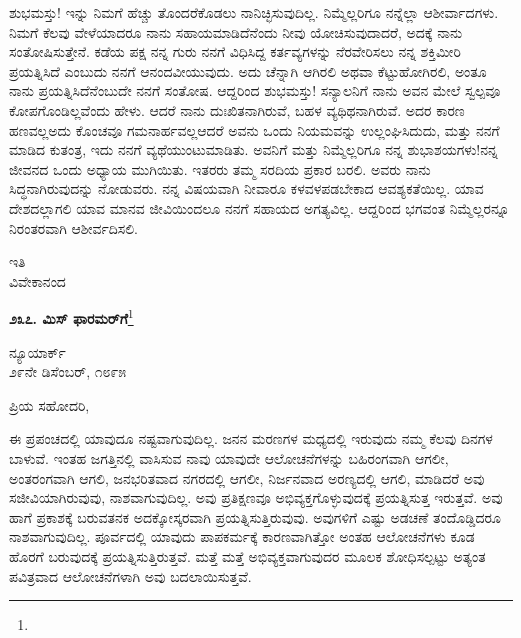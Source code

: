 ಶುಭಮಸ್ತು! ಇನ್ನು ನಿಮಗೆ ಹೆಚ್ಚು ತೊಂದರೆಕೊಡಲು ನಾನಿಚ್ಛಿಸುವುದಿಲ್ಲ. ನಿಮ್ಮೆಲ್ಲರಿಗೂ ನನ್ನೆಲ್ಲಾ ಆಶೀರ್ವಾದಗಳು. ನಿಮಗೆ ಕೆಲವು ವೇಳೆಯಾದರೂ ನಾನು ಸಹಾಯಮಾಡಿದೆನೆಂದು ನೀವು ಯೋಚಿಸುವುದಾದರೆ, ಅದಕ್ಕೆ ನಾನು ಸಂತೋಷಿಸುತ್ತೇನೆ. ಕಡೆಯ ಪಕ್ಷ ನನ್ನ ಗುರು ನನಗೆ ವಿಧಿಸಿದ್ದ ಕರ್ತವ್ಯಗಳನ್ನು ನೆರವೇರಿಸಲು ನನ್ನ ಶಕ್ತಿಮೀರಿ ಪ್ರಯತ್ನಿಸಿದೆ ಎಂಬುದು ನನಗೆ ಆನಂದವೀಯುವುದು. ಅದು ಚೆನ್ನಾಗಿ ಆಗಿರಲಿ ಅಥವಾ ಕೆಟ್ಟುಹೋಗಿರಲಿ, ಅಂತೂ ನಾನು ಪ್ರಯತ್ನಿಸಿದೆನೆಂಬುದೇ ನನಗೆ ಸಂತೋಷ. ಆದ್ದರಿಂದ ಶುಭಮಸ್ತು! ಸನ್ಯಾಲನಿಗೆ ನಾನು ಅವನ ಮೇಲೆ ಸ್ವಲ್ಪವೂ ಕೋಪಗೊಂಡಿಲ್ಲವೆಂದು ಹೇಳು. ಆದರೆ ನಾನು ದುಃಖಿತನಾಗಿರುವೆ, ಬಹಳ ವ್ಯಥಿಥನಾಗಿರುವೆ. ಅದರ ಕಾರಣ ಹಣವಲ್ಲ\enginline{-}ಅದು ಕೊಂಚವೂ ಗಮನಾರ್ಹವಲ್ಲ\enginline{-}ಆದರೆ ಅವನು ಒಂದು ನಿಯಮವನ್ನು ಉಲ್ಲಂಘಿಸಿದುದು, ಮತ್ತು ನನಗೆ ಮಾಡಿದ ಕುತಂತ್ರ, ಇದು ನನಗೆ ವ್ಯಥೆಯುಂಟುಮಾಡಿತು. ಅವನಿಗೆ ಮತ್ತು ನಿಮ್ಮೆಲ್ಲರಿಗೂ ನನ್ನ ಶುಭಾಶಯಗಳು!ನನ್ನ ಜೀವನದ ಒಂದು ಅಧ್ಯಾಯ ಮುಗಿಯಿತು. ಇತರರು ತಮ್ಮ ಸರದಿಯ ಪ್ರಕಾರ ಬರಲಿ. ಅವರು ನಾನು ಸಿದ್ಧನಾಗಿರುವುದನ್ನು ನೋಡುವರು. ನನ್ನ ವಿಷಯವಾಗಿ ನೀವಾರೂ ಕಳವಳಪಡಬೇಕಾದ ಆವಶ್ಯಕತೆಯಿಲ್ಲ. ಯಾವ ದೇಶದಲ್ಲಾಗಲಿ ಯಾವ ಮಾನವ ಜೀವಿಯಿಂದಲೂ ನನಗೆ ಸಹಾಯದ ಅಗತ್ಯವಿಲ್ಲ. ಆದ್ದರಿಂದ ಭಗವಂತ ನಿಮ್ಮೆಲ್ಲರನ್ನೂ ನಿರಂತರವಾಗಿ ಆಶೀರ್ವದಿಸಲಿ.

\vspace{-0.5cm}

{\flushright
ಇತಿ\\ವಿವೇಕಾನಂದ\par}

\begin{center}
\textbf{೨೩೭. ಮಿಸ್ ಫಾರಮರ್‌ಗೆ}\footnote{}
\end{center}

\vspace{-0.65cm}

\begin{flushright}
ನ್ಯೂಯಾರ್ಕ್\\೨೯ನೇ ಡಿಸೆಂಬರ್, ೧೮೯೫
\end{flushright}

\vspace{-0.3cm}

\noindent
ಪ್ರಿಯ ಸಹೋದರಿ,

ಈ ಪ್ರಪಂಚದಲ್ಲಿ ಯಾವುದೂ ನಷ್ಟವಾಗುವುದಿಲ್ಲ. ಜನನ ಮರಣಗಳ ಮಧ್ಯದಲ್ಲಿ ಇರುವುದು ನಮ್ಮ ಕೆಲವು ದಿನಗಳ ಬಾಳುವೆ. ಇಂತಹ ಜಗತ್ತಿನಲ್ಲಿ ವಾಸಿಸುವ ನಾವು ಯಾವುದೇ ಆಲೋಚನೆಗಳನ್ನು ಬಹಿರಂಗವಾಗಿ ಆಗಲೀ, ಅಂತರಂಗವಾಗಿ ಆಗಲಿ, ಜನಭರಿತವಾದ ನಗರದಲ್ಲಿ ಆಗಲೀ, ನಿರ್ಜನವಾದ ಅರಣ್ಯದಲ್ಲಿ ಆಗಲಿ, ಮಾಡಿದರೆ ಅವು ಸಜೀವಿಯಾಗಿರುವುವು, ನಾಶವಾಗುವುದಿಲ್ಲ. ಅವು ಪ್ರತಿಕ್ಷಣವೂ ಅಭಿವ್ಯಕ್ತಗೊಳ್ಳುವುದಕ್ಕೆ ಪ್ರಯತ್ನಿಸುತ್ತ ಇರುತ್ತವೆ. ಅವು ಹಾಗೆ ಪ್ರಕಾಶಕ್ಕೆ ಬರುವತನಕ ಅದಕ್ಕೋಸ್ಕರವಾಗಿ ಪ್ರಯತ್ನಿಸುತ್ತಿರುವುವು. ಅವುಗಳಿಗೆ ಎಷ್ಟು ಅಡಚಣೆ ತಂದೊಡ್ಡಿದರೂ ನಾಶವಾಗುವುದಿಲ್ಲ. ಪೂರ್ವದಲ್ಲಿ ಯಾವುದು ಪಾಪಕರ್ಮಕ್ಕೆ ಕಾರಣವಾಗಿತ್ತೋ ಅಂತಹ ಆಲೋಚನೆಗಳು ಕೂಡ ಹೊರಗೆ ಬರುವುದಕ್ಕೆ ಪ್ರಯತ್ನಿಸುತ್ತಿರುತ್ತವೆ. ಮತ್ತೆ ಮತ್ತೆ ಅಭಿವ್ಯಕ್ತವಾಗುವುದರ ಮೂಲಕ ಶೋಧಿಸಲ್ಪಟ್ಟು ಅತ್ಯಂತ ಪವಿತ್ರವಾದ ಆಲೋಚನೆಗಳಾಗಿ ಅವು ಬದಲಾಯಿಸುತ್ತವೆ.

